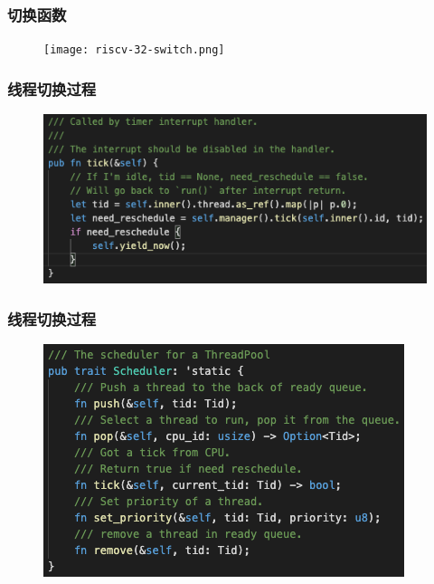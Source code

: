 \begin{frame}[fragile]
    \frametitle{切换函数}
    \begin{figure}
    \texttt{[image: riscv-32-switch.png]}
    \end{figure}

\end{frame}
% 
% 
% 
% 
% 
\begin{frame}[fragile]
    \frametitle{线程切换过程}
    \begin{figure}
    \includegraphics[width=0.8\linewidth]{figs/fn-tick.png}
    \end{figure}
\end{frame}

\begin{frame}[fragile]
    \frametitle{线程切换过程}
    \begin{figure}
    \includegraphics[width=0.65\linewidth]{figs/scheduler.png}
    \end{figure}

\end{frame}
% 
% 
% 
% 
% 
